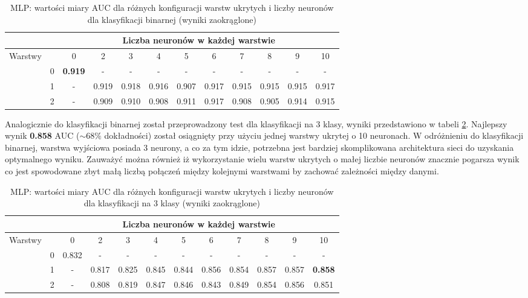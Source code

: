 \documentclass[a4paper, twoside, 11pt, openright]{article}
\begin{document}
\begin{table}[H]
    \centering
    \begin{tabular}{|c|c|c|c|c|c|c|c|c|c|c|c|}
        \hline
         & &  \multicolumn{10}{c|}{Liczba neuronów w każdej warstwie}  \\ \hline
        \multirow{4}{*}{Warstwy} & & 0 & 2 & 3 & 4 & 5 & 6 & 7 & 8 & 9 & 10  \\ \cline{2 - 12}
			& 0 & \textbf{0.919} & - & - & - & - & - & - & - & - & - \\ \cline{2 - 12} 
			& 1 & - &  0.919 &  0.918 &  0.916 &  0.907 &  0.917 &  0.915 &  0.915 &  0.915  & 0.917 \\ \cline{2 - 12} 
			& 2 & - & 0.909 &    0.910 &   0.908 &   0.911 &   0.917 &   0.908 &   0.905 &   0.914 & 0.915 \\ \cline{2 - 12} \hline

    \end{tabular}
    \caption{MLP: wartości miary AUC dla różnych konfiguracji warstw ukrytych i liczby neuronów dla klasyfikacji binarnej (wyniki zaokrąglone)}
    \label{tab:nn_layers_binary}
\end{table}

Analogicznie do klasyfikacji binarnej został przeprowadzony test dla klasyfikacji na 3 klasy, wyniki przedstawiono w tabeli \ref{tab:nn_layers_discrete}. Najlepszy wynik \textbf{0.858} AUC ($\sim 68\%$ dokładności) został osiągnięty przy użyciu jednej warstwy ukrytej o 10 neuronach. W odróżnieniu do klasyfikacji binarnej, warstwa wyjściowa posiada 3 neurony, a co za tym idzie, potrzebna jest bardziej skomplikowana architektura sieci do uzyskania optymalnego wyniku. Zauważyć można również iż wykorzystanie wielu warstw ukrytych o małej liczbie neuronów znacznie pogarsza wynik co jest spowodowane zbyt małą liczbą połączeń między kolejnymi warstwami by zachować zależności między danymi.

\begin{table}[H]
    \centering
    \begin{tabular}{|c|c|c|c|c|c|c|c|c|c|c|c|}
        \hline
         & &  \multicolumn{10}{c|}{Liczba neuronów w każdej warstwie}  \\ \hline
        \multirow{4}{*}{Warstwy} & & 0 & 2 & 3 & 4 & 5 & 6 & 7 & 8 & 9 & 10  \\ \cline{2 - 12}
			& 0 & 0.832 & - & - & - & - & - & - & - & - & - \\ \cline{2 - 12} 
			& 1 & - &  0.817 &  0.825 &  0.845 &  0.844 &  0.856 &  0.854 &  0.857 &  0.857 & \textbf{0.858} \\ \cline{2 - 12} 
			& 2 & - & 0.808 &   0.819 &   0.847 &   0.846 &   0.843 &   0.849 &   0.854 &   0.856 &   0.851  \\ \cline{2 - 12} \hline

    \end{tabular}
    \caption{MLP: wartości miary AUC dla różnych konfiguracji warstw ukrytych i liczby neuronów dla klasyfikacji na 3 klasy (wyniki zaokrąglone)}
    \label{tab:nn_layers_discrete}
\end{table}
\end{document}
